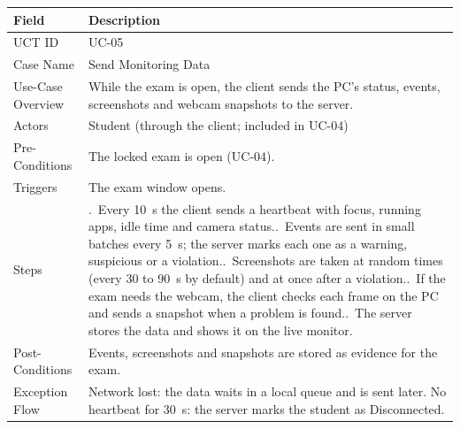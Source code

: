 \begin{lrbox}{\uctbox}{\small\renewcommand{\arraystretch}{1.1}\setlength{\tabcolsep}{6pt}%
\begin{tabular}{>{\raggedright\arraybackslash}p{3.6cm}>{\raggedright\arraybackslash}p{\dimexpr\textwidth-3.6cm-4\tabcolsep\relax}}
\hline\hline
\textbf{Field} & \textbf{Description} \\ \hline
UCT ID & UC-05 \\
Case Name & Send Monitoring Data \\
Use-Case Overview & While the exam is open, the client sends the PC's status, events, screenshots and webcam snapshots to the server. \\
Actors & Student (through the client; included in UC-04) \\
Pre-Conditions & The locked exam is open (UC-04). \\
Triggers & The exam window opens. \\
Steps & 1.~Every 10~s the client sends a heartbeat with focus, running apps, idle time and camera status.\newline
2.~Events are sent in small batches every 5~s; the server marks each one as a warning, suspicious or a violation.\newline
3.~Screenshots are taken at random times (every 30 to 90~s by default) and at once after a violation.\newline
4.~If the exam needs the webcam, the client checks each frame on the PC and sends a snapshot when a problem is found.\newline
5.~The server stores the data and shows it on the live monitor. \\
Post-Conditions & Events, screenshots and snapshots are stored as evidence for the exam. \\
Exception Flow & Network lost: the data waits in a local queue and is sent later. No heartbeat for 30~s: the server marks the student as Disconnected. \\
\hline\hline
\end{tabular}}\end{lrbox}
\begin{table}[H]
\centering
\caption{Use Case Table for Send Monitoring Data}\label{tab:uc05}
\vspace{4pt}
\usebox{\uctbox}
\end{table}

